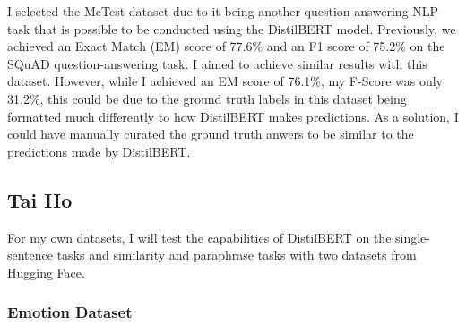 \documentclass[
  11pt,
]{article}
\begin{document}
I selected the McTest dataset due to it being another question-answering
NLP task that is possible to be conducted using the DistilBERT model.
Previously, we achieved an Exact Match (EM) score of 77.6\% and an F1
score of 75.2\% on the SQuAD question-answering task. I aimed to achieve
similar results with this dataset. However, while I achieved an EM score
of 76.1\%, my F-Score was only 31.2\%, this could be due to the ground
truth labels in this dataset being formatted much differently to how
DistilBERT makes predictions. As a solution, I could have manually
curated the ground truth anwers to be similar to the predictions made by
DistilBERT.

\subsection{Tai Ho}\label{tai-ho}

For my own datasets, I will test the capabilities of DistilBERT on the
single-sentence tasks and similarity and paraphrase tasks with two
datasets from Hugging Face.

\subsubsection{Emotion Dataset}\label{emotion-dataset}
\end{document}
